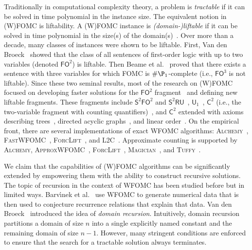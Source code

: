 \documentclass{article}
\theoremstyle{definition}
\theoremstyle{remark}
\newcommand{\FOtwo}{$\mathsf{FO}^{2}$}
\newcommand{\FOthree}{$\mathsf{FO}^{3}$}
\newcommand{\SFO}{$\mathsf{S}^{2}\mathsf{FO}^{2}$}
\newcommand{\SRU}{$\mathsf{S}^{2}\mathsf{RU}$}
\newcommand{\Uone}{$\mathsf{U}_{1}$}
\newcommand{\Ctwo}{$\mathsf{C}^{2}$}
\begin{document}
Traditionally in computational complexity theory, a problem is \emph{tractable}
if it can be solved in time polynomial in the instance size. The equivalent
notion in (W)FOMC is liftability. A (W)FOMC instance is \emph{(domain-)liftable}
if it can be solved in time polynomial in the size(s) of the
domain(s)~\cite{DBLP:conf/starai/JaegerB12}. Over more than a decade, many
classes of instances were shown to be liftable. First, Van den
Broeck~ showed that the class of all
sentences of first-order logic with up to two variables (denoted \FOtwo{}) is
liftable. Then Beame et al.~ proved that
there exists a sentence with three variables for which FOMC is
$\#\P_{1}$-complete (i.e., \FOthree{} is not liftable). Since these two seminal
results, most of the research on (W)FOMC focused on developing faster solutions
for the \FOtwo{}
fragment~\cite{DBLP:conf/uai/BremenK21,DBLP:conf/aaai/MalhotraS22} and defining
new liftable fragments. These fragments include \SFO{} and
\SRU{}~\cite{DBLP:conf/nips/KazemiKBP16},
\Uone{}~\cite{DBLP:conf/lics/KuusistoL18}, \Ctwo{} (i.e., the two-variable
fragment with counting
quantifiers)~\cite{DBLP:journals/jair/Kuzelka21,DBLP:conf/aaai/MalhotraS22}, and
\Ctwo{} extended with axioms describing trees~\cite{DBLP:conf/kr/BremenK21},
directed acyclic graphs~\cite{DBLP:journals/corr/abs-2302-09830}, and linear
order~\cite{DBLP:journals/corr/abs-2211-01164}. On the empirical front, there
are several implementations of exact WFOMC algorithms:
\textsc{Alchemy}~\cite{DBLP:journals/cacm/GogateD16},
\textsc{FastWFOMC}~\cite{DBLP:conf/uai/BremenK21},
\textsc{ForcLift}~\cite{DBLP:conf/ijcai/BroeckTMDR11}, and
\textsc{L2C}~\cite{DBLP:conf/kr/KazemiP16}. Approximate counting is supported by
\textsc{Alchemy}, \textsc{ApproxWFOMC}~\cite{DBLP:conf/ijcai/BremenK20},
\textsc{ForcLift}~\cite{DBLP:conf/uai/BroeckCD12},
\textsc{Magician}~\cite{DBLP:conf/aaai/VenugopalSG15}, and
\textsc{Tuffy}~\cite{DBLP:journals/pvldb/NiuRDS11}.


We claim that the capabilities of (W)FOMC algorithms can be significantly
extended by empowering them with the ability to construct recursive solutions.
The topic of recursion in the context of WFOMC has been studied before but in
limited ways. Barv{\'{\i}}nek et al.~
use WFOMC to generate numerical data that is then used to conjecture recurrence
relations that explain that data. Van den
Broeck~ introduced the idea of \emph{domain
  recursion}. Intuitively, domain recursion partitions a domain of size $n$ into
a single explicitly named constant and the remaining domain of size $n-1$.
However, many stringent conditions are enforced to ensure that the search for a
tractable solution always terminates.
\end{document}
